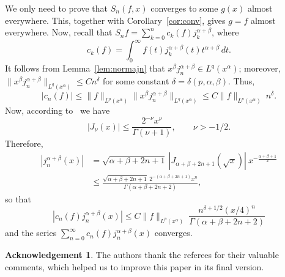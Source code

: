 \documentclass[reqno]{amsart}
\theoremstyle{plain}
\theoremstyle{definition}
\newtheorem*{Ackn}{Acknowledgement}
\theoremstyle{remark}
\newcommand{\lpnorm}[3]{\|{#1}\|_{L^{#2}({#3})}} %
\begin{document}
We only need to prove that $S_n(f,x)$ converges to some $g(x)$ almost
everywhere. This, together with Corollary~\ref{cor:conv}, gives $g = f$ almost
everywhere. Now, recall that $S_n f = \sum_{k=0}^n c_k(f) j_k^{\alpha+\beta}$,
where
\begin{equation*}
   c_k(f) = \int_0^\infty f(t) j_k^{\alpha+\beta}(t) t^{\alpha+\beta} \, dt.
\end{equation*}
It follows from Lemma~\ref{lem:normajn} that
$x^\beta j_n^{\alpha+\beta} \in L^q(x^\alpha)$; moreover,
$\lpnorm{x^\beta j_n^{\alpha+\beta}}{q}{x^\alpha} \le C n^\delta$
for some constant $\delta = \delta(p,\alpha,\beta)$. Thus,
\begin{equation*}
   |c_n(f)|
   \le \lpnorm{f}p{x^\alpha}
       \lpnorm{x^\beta j_n^{\alpha+\beta}}q{x^\alpha}
   \le C \lpnorm{f}p{x^\alpha}\ n^\delta.
\end{equation*}
Now, according to~\cite[Ch.~III, 3.31 (1), p.~49]{Wat} we have
\begin{equation*}
   |J_\nu(x)| \leq \frac{2^{-\nu} x^\nu}{\Gamma(\nu+1)},
   \qquad \nu > -1/2.
\end{equation*}
Therefore,
\begin{align*}
   |j_n^{\alpha+\beta}(x)|
   &= \sqrt{\alpha+\beta+2n+1}\ |J_{\alpha+\beta+2n+1}(\sqrt{x})|
   \ x^{-\frac{\alpha+\beta+1}{2}} \\
   &\leq \frac{\sqrt{\alpha+\beta+2n+1}\ 2^{-(\alpha+\beta+2n+1)} x^n}
             {\Gamma(\alpha+\beta+2n+2)},
\end{align*}
so that
\begin{equation*}
   |c_n(f) j_n^{\alpha+\beta}(x)| \leq C \lpnorm{f}p{x^\alpha}
   \ \frac{n^{\delta+1/2} (x/4)^n}{\Gamma(\alpha+\beta+2n+2)}
\end{equation*}
and the series $\sum_{n=0}^\infty c_n(f) j_n^{\alpha+\beta}(x)$ converges.


\begin{Ackn} The authors thank the referees for their valuable
comments, which helped us to improve this paper in its final version.
\end{Ackn}



\end{document}
